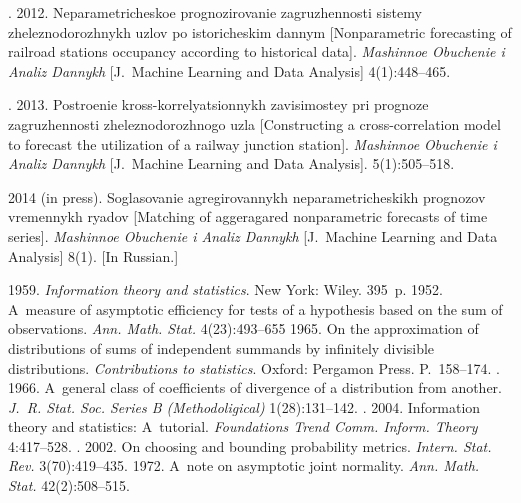   \begin{multicols}{2}

\renewcommand{\bibname}{\protect\rmfamily References}

{\small\frenchspacing
{%
\begin{thebibliography}{99}

.
2012. Neparametricheskoe prognozirovanie zagruzhennosti sistemy zheleznodorozhnykh uzlov
po istoricheskim dannym [Nonparametric forecasting of railroad stations
occupancy according to historical data].
\textit{Mashinnoe Obuchenie i Analiz Dannykh}
[J.~Machine Learning and Data Analysis] 4(1):448--465.

.
2013. Postroenie kross-korrelyatsionnykh zavisimostey pri prognoze zagruzhennosti
zheleznodorozhnogo uzla [Constructing a cross-correlation model to forecast the
utilization of a railway junction station].
\textit{Mashinnoe Obuchenie i Analiz Dannykh}
[J.~Machine Learning and Data Analysis]. 5(1):505--518.

  2014 (in press). Soglasovanie agregirovannykh
neparametricheskikh prognozov vremennykh ryadov
[Matching of aggeragared nonparametric forecasts of time series].
\textit{Mashinnoe Obuchenie i Analiz Dannykh}
[J.~Machine Learning and Data Analysis] 8(1). [In Russian.]

\columnbreak

  1959. \textit{Information theory and statistics}.
New York: Wiley. 395~p.
 1952. A~measure of asymptotic efficiency for tests of a
hypothesis based on the sum of observations. \textit{Ann. Math. Stat.} 4(23):493--655
 1965. On the approximation of
distributions of sums of independent summands by infinitely divisible
distributions.
\textit{Contributions to statistics}. Oxford: Pergamon Press. P.~158--174.
. 1966.
A~general class of coefficients of divergence of a distribution from another.
\textit{J.~R. Stat. Soc. Series B (Methodoligical)} 1(28):131--142.
. 2004. Information theory and statistics:
A~tutorial. \textit{Foundations Trend Comm. Inform. Theory}
4:417--528.
.  2002. On choosing and bounding probability
metrics. \textit{Intern. Stat. Rev.} 3(70):419--435.
 1972. A~note on asymptotic joint normality.
\textit{Ann. Math. Stat.} 42(2):508--515.


\end{thebibliography}}}
\end{multicols}
